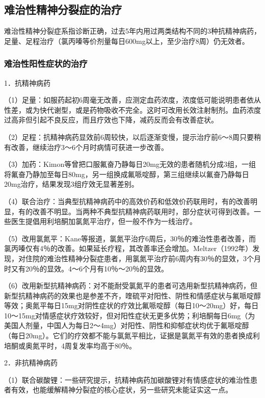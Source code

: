 \subsection{难治性精神分裂症的治疗}

难治性精神分裂症系指诊断正确，过去5年内用过两类结构不同的3种抗精神病药，足量、足程治疗（氯丙嗪等价剂量每日600mg以上，至少治疗8周）仍无效者。

\subsubsection{难治性阳性症状的治疗}

1．抗精神病药

（1）足量：如服药起初6周毫无改善，应测定血药浓度，浓度低可能说明患者依从性差，或为快代谢型，或是药物吸收不完全。这时可改用长效注射制剂。血药浓度过高非但引起不良反应，而且疗效也下降，减药反而会有改善症状。

（2）足程：抗精神病药显效前6周较快，以后逐渐变慢，提示治疗前6～8周只要稍有改善，继续治疗3～6个月时病情可获进一步改善。

（3）加药：Kimon等曾把口服氟奋乃静每日20mg无效的患者随机分成3组，一组将氟奋乃静加至每日80mg，另一组换成氟哌啶醇，第三组继续以氟奋乃静每日20mg治疗，结果发现3组疗效无显著差别。

（4）联合治疗：当典型抗精神病药中的高效价药和低效价药联用时，有的改善明显，有的改善不明显。当两种不典型抗精神病药联用时，部分症状可得到改善。一些医生提倡用利培酮加氯氮平治疗，但一般不作为一线治疗。

（5）改用氯氮平：Kane等报道，氯氮平治疗6周后，30％的难治性患者改善，而氯丙嗪仅有4％的改善。如果延长疗程，其改善率还会增加。Meltzer（1992年）发现，对住院的难治性精神分裂症患者，用氯氮平治疗前6周内有30％的显效，3个月时又有20％的显效。4～6个月有10％～20％的显效。

（6）改用新型抗精神病药：对不能耐受氯氮平的患者可选用新型抗精神病药，但新型抗精神病药的效果也是参差不齐，喹硫平对阳性、阴性和情感症状与氟哌啶醇等效；奥氮平每日15mg对阴性症状的疗效比氟哌啶醇（每日10～20mg）好，每日10～15mg对情感症状疗效较好，但对阳性症状无更多优势；利培酮每日6mg（为美国人剂量，中国人为每日2～4mg）对阳性、阴性和抑郁症状均优于氟哌啶醇（每日20mg）。它们的疗效都不能与氯氮平相比，证据是氯氮平有效的患者换成利培酮或奥氮平时，4周复发率均高于80％。

2．非抗精神病药

（1）联合碳酸锂：一些研究提示，抗精神病药加碳酸锂对有情感症状的难治性患者有效，也能缓解精神分裂症的核心症状，另一些研究未能证实这一点。

